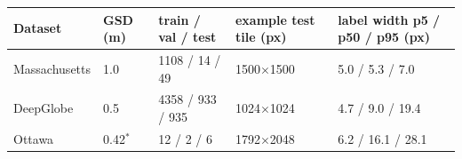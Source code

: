 \begin{tabular}{@{}lllll@{}}
\toprule
Dataset & GSD (m) & train / val / test & example test tile (px) & label width p5 / p50 / p95 (px) \\
\midrule
Massachusetts & 1.0 & 1108 / 14 / 49 & 1500$\times$1500 & 5.0 / 5.3 / 7.0 \\
DeepGlobe & 0.5 & 4358 / 933 / 935 & 1024$\times$1024 & 4.7 / 9.0 / 19.4 \\
Ottawa & 0.42$^{*}$ & 12 / 2 / 6 & 1792$\times$2048 & 6.2 / 16.1 / 28.1 \\
\bottomrule
\end{tabular}

